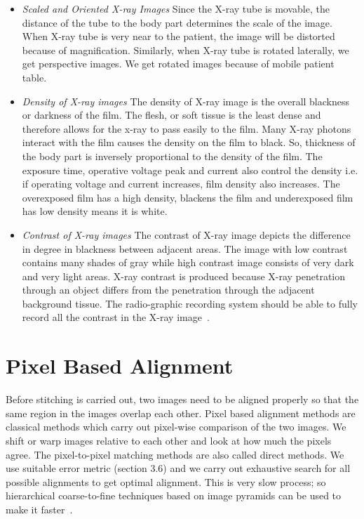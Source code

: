\begin{itemize}

	\item{\textit{Scaled and Oriented X-ray Images}} Since the X-ray tube is movable, the distance of the tube to the body part determines the scale of the image. When X-ray tube is very near to the patient, the image will be distorted because of magnification. Similarly, when X-ray tube is rotated laterally, we get perspective images. We get rotated images because of mobile patient table. 
	
	\item{\textit{Density of X-ray images}} The density of X-ray image is  the overall blackness or darkness of the film. The flesh, or soft tissue is the least dense and therefore allows for the x-ray to pass easily to the film. Many X-ray photons interact with the film causes the density on the film to black. So, thickness of the body part is inversely proportional to the density of the film. The exposure time, operative voltage peak and current also control the density i.e. if operating voltage and current increases, film density also increases. The overexposed film has a high density, blackens the film and underexposed film has low density means it is white.
	
\item{\textit{Contrast of X-ray images}} The contrast of X-ray image depicts the difference in degree in blackness between adjacent areas. The image with low contrast contains many shades of gray while high contrast image consists of very dark and very light areas. X-ray contrast is produced because X-ray penetration through an object differs from the penetration through the adjacent background tissue. The radio-graphic recording system should be able to fully record all the contrast in the X-ray image~\cite{Sprawls:online}.
\end{itemize}






\section{Pixel Based Alignment}
Before stitching is carried out, two images need to be aligned properly so that the same region in the images overlap each other. Pixel based alignment methods are classical methods which carry out pixel-wise comparison of the two images. We shift or warp images relative to each other and look at how much the pixels agree. The pixel-to-pixel matching methods are also called direct methods. We use suitable error metric (section 3.6) and we carry out exhaustive search for all possible alignments to get optimal alignment. This is very slow process; so hierarchical coarse-to-fine techniques based on image pyramids can be used to make it faster~\cite{Szeliski:06}.




